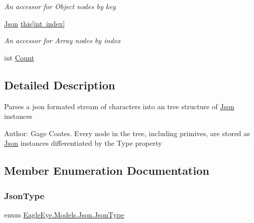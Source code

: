 \begin{DoxyCompactItemize}
\begin{DoxyCompactList}\small\item\em An accessor for Object nodes by key \end{DoxyCompactList}\item 
\mbox{\hyperlink{class_eagle_eye_1_1_models_1_1_json}{Json}} \mbox{\hyperlink{class_eagle_eye_1_1_models_1_1_json_a6a06a70ad6294d135adfa0d66b8b5978}{this\mbox{[}int index\mbox{]}}}
\begin{DoxyCompactList}\small\item\em An accessor for Array nodes by index \end{DoxyCompactList}\item 
int \mbox{\hyperlink{class_eagle_eye_1_1_models_1_1_json_a3f1f39dbe0728fa7591a88435c5ce7b4}{Count}}
\end{DoxyCompactItemize}


\subsection{Detailed Description}
Parses a json formated stream of characters into an tree structure of \mbox{\hyperlink{class_eagle_eye_1_1_models_1_1_json}{Json}} instances 

Author\+: Gage Coates. Every node in the tree, including primives, are stored as \mbox{\hyperlink{class_eagle_eye_1_1_models_1_1_json}{Json}} instances differentiated by the Type property 

\subsection{Member Enumeration Documentation}
\mbox{\label{class_eagle_eye_1_1_models_1_1_json_afdf0e16163f8b9bab5b45d6d01e8133c}} 
\subsubsection{\texorpdfstring{JsonType}{JsonType}}
{\footnotesize\ttfamily enum \mbox{\hyperlink{class_eagle_eye_1_1_models_1_1_json_afdf0e16163f8b9bab5b45d6d01e8133c}{Eagle\+Eye.\+Models.\+Json.\+Json\+Type}}\hspace{0.3cm}{\ttfamily [strong]}}



